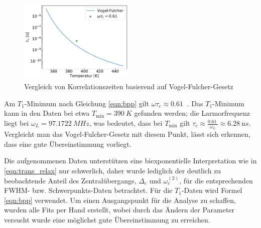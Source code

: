 \begin{figure}
	\vspace{-20pt}
	\begin{center}
		\includegraphics[width=0.49\textwidth]{graphics/zwischenbericht/tau_c_arrhenius_vogel_fulcher.pdf}
	\end{center}
	\vspace{-20pt}
	\caption{Vergleich von Korrelationszeiten basierend auf Vogel-Fulcher-Gesetz \label{fig:korrelationszeiten}}
\end{figure}
Am $T_1$-Minimum nach Gleichung \eqref{eqn:bpp} gilt $\omega \tau_c \approx \SI{0.61}{}$ \cite[S. 629]{omegatau061}. Das $T_1$-Minimum kann in den Daten bei etwa $T_\text{min} = \SI{390}{K}$ gefunden werden; die Larmorfrequenz liegt bei $\omega_L = \SI{97.1722}{MHz}$, was bedeutet, dass bei $T_\text{min}$ gilt $\tau_c \approx \frac{\SI{0.61}{}}{\omega_L} \approx \SI{6.28}{\nano s}$. Vergleicht man das Vogel-Fulcher-Gesetz mit diesem Punkt, lässt sich erkennen, dass eine gute Übereinstimmung vorliegt.


Die aufgenommenen Daten unterstützen eine biexponentielle Interpretation wie in \eqref{eqn:trans_relax} nur schwerlich, daher wurde lediglich der deutlich zu beobachtende Anteil des Zentralübergangs, $\Delta_c$ und $\omega_c^{(2)}$, für die entsprechenden FWHM- bzw. Schwerpunkts-Daten betrachtet. Für die $T_1$-Daten wird Formel \eqref{eqn:bpp} verwendet. Um einen Ausgangspunkt für die Analyse zu schaffen, wurden alle Fits per Hand erstellt, wobei durch das Ändern der Parameter versucht wurde eine möglichst gute Übereinstimmung zu erreichen.

